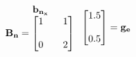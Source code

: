 \documentclass[preview]{standalone}
\begin{document}
\begin{align*}
\begin{array}{c}\begin{matrix}\hspace{1cm} \mathbf{b_{n_x}}  \quad \hspace{0.6cm} \end{matrix} \\ \mathbf{B_n} = \begin{bmatrix} 1 & \quad 1 \\ \\0 &  \quad 2 \end{bmatrix} \end{array}\begin{bmatrix} 1.5 \\ \\ 0.5 \end{bmatrix} = \mathbf{g_e}
\end{align*}
\end{document}
